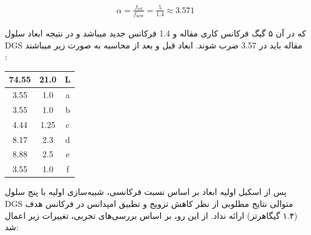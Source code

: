   \begin{align}
 	\label{eq:eq13}
 	\alpha = \frac{f_{\text{ref}}}{f_{\text{new}}} = \frac{5}{1.4} \approx 3.571
 \end{align}
 
 که در آن ۵ گیگ فرکانس کاری مقاله و 1.4 فرکانس جدید میباشد و در نتیجه ابعاد سلول DGS مقاله باید در 3.57 ضرب شوند.
 ابعاد قبل و بعد از محاسبه به صورت زیر میباشند : 
 \begin{center}
 \begin{tabular}{|c|c|c|}
 	\hline
 	74.55 & 21.0 & L \\
 	\hline
 	3.55 & 1.0 & a \\
 	\hline
 	3.55 & 1.0 & b \\
 	\hline
 	4.44 & 1.25 & c \\
 	\hline
 	8.17 & 2.3 & d \\
 	\hline
 	8.88 & 2.5 & e \\
 	\hline
 	3.55 & 1.0 & f \\
 	\hline
 \end{tabular}
 \end{center}
 
پس از اسکیل اولیه ابعاد بر اساس نسبت فرکانسی، شبیه‌سازی اولیه با پنج سلول DGS متوالی نتایج مطلوبی از نظر کاهش تزویج و تطبیق امپدانس در فرکانس هدف (۱.۴ گیگاهرتز) ارائه نداد. از این رو، بر اساس بررسی‌های تجربی، تغییرات زیر اعمال شد:
 
 
 
 